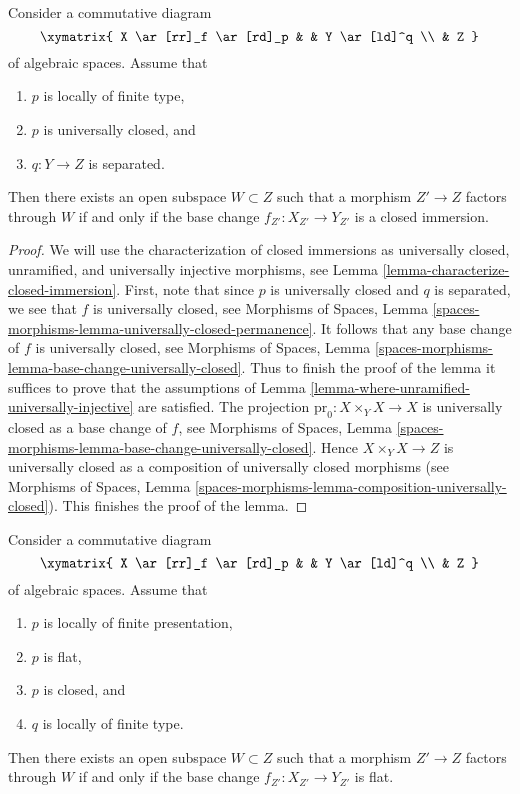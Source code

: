 \begin{lemma}
\label{lemma-where-closed-immersion}
Consider a commutative diagram
$$
\xymatrix{
X \ar[rr]_f \ar[rd]_p & & Y \ar[ld]^q \\
& Z
}
$$
of algebraic spaces. Assume that
\begin{enumerate}
\item $p$ is locally of finite type,
\item $p$ is universally closed, and
\item $q : Y \to Z$ is separated.
\end{enumerate}
Then there exists an open subspace $W \subset Z$
such that a morphism $Z' \to Z$ factors through $W$ if and only if the
base change $f_{Z'} : X_{Z'} \to Y_{Z'}$ is a closed immersion.
\end{lemma}

\begin{proof}
We will use the characterization of closed immersions as
universally closed, unramified, and universally injective morphisms, see
Lemma \ref{lemma-characterize-closed-immersion}.
First, note that since $p$ is universally closed and $q$ is
separated, we see that $f$ is universally closed, see
Morphisms of Spaces, Lemma
\ref{spaces-morphisms-lemma-universally-closed-permanence}.
It follows that any base change of $f$ is universally closed, see
Morphisms of Spaces, Lemma
\ref{spaces-morphisms-lemma-base-change-universally-closed}.
Thus to finish the proof of the lemma it suffices to prove that
the assumptions of
Lemma \ref{lemma-where-unramified-universally-injective}
are satisfied. The projection $\text{pr}_0 : X \times_Y X \to X$
is universally closed as a base change of $f$, see
Morphisms of Spaces, Lemma
\ref{spaces-morphisms-lemma-base-change-universally-closed}.
Hence $X \times_Y X \to Z$ is universally closed as
a composition of universally closed morphisms (see
Morphisms of Spaces, Lemma
\ref{spaces-morphisms-lemma-composition-universally-closed}).
This finishes the proof of the lemma.
\end{proof}

\begin{lemma}
\label{lemma-where-flat}
Consider a commutative diagram
$$
\xymatrix{
X \ar[rr]_f \ar[rd]_p & & Y \ar[ld]^q \\
& Z
}
$$
of algebraic spaces. Assume that
\begin{enumerate}
\item $p$ is locally of finite presentation,
\item $p$ is flat,
\item $p$ is closed, and
\item $q$ is locally of finite type.
\end{enumerate}
Then there exists an open subspace $W \subset Z$
such that a morphism $Z' \to Z$ factors through $W$ if and only if the
base change $f_{Z'} : X_{Z'} \to Y_{Z'}$ is flat.
\end{lemma}

